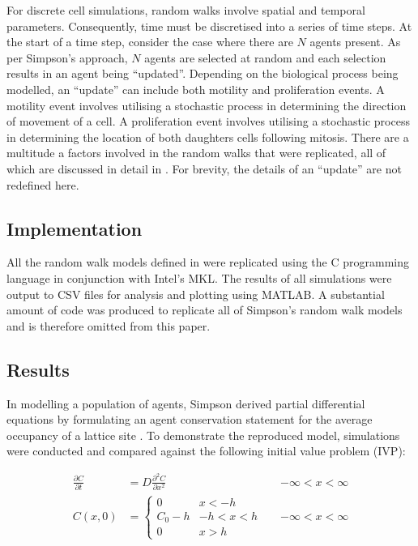\documentclass[11pt,a4paper]{article}
\begin{document}
		For discrete cell simulations, random walks involve spatial and temporal parameters. Consequently, time must be discretised into a series of time steps. At the start of a time step, consider the case where there are $N$ agents present. As per Simpson's approach, $N$ agents are selected at random and each selection results in an agent being ``updated''. Depending on the biological process being modelled, an ``update'' can include both motility and proliferation events. A motility event involves utilising a stochastic process in determining the direction of movement of a cell. A proliferation event involves utilising a stochastic process in determining the location of both daughters cells following mitosis. There are a multitude a factors involved in the random walks that were replicated, all of which are discussed in detail in \cite{simpson2009diffusing,simpson2010cell}. For brevity, the details of an ``update'' are not redefined here.
	

	\subsection{Implementation}
		\label{sub:implementation}
		
		All the random walk models defined in \cite{simpson2009diffusing,simpson2010cell} were replicated using the C programming language in conjunction with Intel's MKL. The results of all simulations were output to CSV files for analysis and plotting using MATLAB. A substantial amount of code was produced to replicate all of Simpson's random walk models and is therefore omitted from this paper.
	

	\subsection{Results}
		\label{sub:results}
		
		In modelling a population of agents, Simpson derived partial differential equations by formulating an agent conservation statement for the average occupancy of a lattice site \cite{simpson2009diffusing}. To demonstrate the reproduced model, simulations were conducted and compared against the following initial value problem (IVP):

		\begin{align}
  			\frac{\partial C}{\partial t} &= D \frac{\partial^2 C}{\partial x^2} && -\infty < x < \infty \\ 
  			C(x,0) &= 
  			\begin{cases}
   				0 & x < -h \\
   				C_0 - h & -h < x < h \\
   				0 & x > h
  			\end{cases}
  			&& -\infty < x < \infty
  			\label{eq:ivp_ic}
		\end{align}
\end{document}
